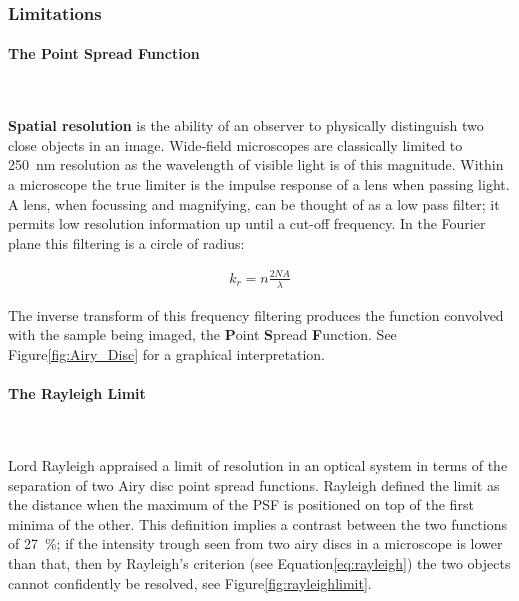 \subsubsection{Limitations}

\paragraph{The Point Spread Function}~

\textbf{Spatial resolution} is the ability of an observer to physically distinguish two close objects in an image\cite{Tsekenis2015}.
Wide-field microscopes are classically limited to \SI{250}{\nano\meter} resolution as the wavelength of visible light is of this magnitude\cite{Bradbury1998}.
Within a microscope the true limiter is the impulse response of a lens when passing light.
A lens, when focussing and magnifying, can be thought of as a low pass filter; it permits low resolution information up until a cut-off frequency.
In the Fourier plane this filtering is a circle of radius:

\begin{align}
k_r = n\frac{2 NA}{\lambda}
\end{align}

The inverse transform of this frequency filtering produces the function convolved with the sample being imaged, the \textbf{P}oint \textbf{S}pread \textbf{F}unction.
See Figure\ref{fig:Airy_Disc} for a graphical interpretation.

\paragraph{The Rayleigh Limit}~

Lord Rayleigh appraised a limit of resolution in an optical system in terms of the separation of two Airy disc point spread functions.
Rayleigh defined the limit as the distance when the maximum of the PSF is positioned on top of the first minima of the other.
This definition implies a contrast between the two functions of \SI{27}{\percent}; if the intensity trough seen from two airy discs in a microscope is lower than that, then by Rayleigh's criterion (see Equation\ref{eq:rayleigh}) the two objects cannot confidently be resolved, see Figure\ref{fig:rayleighlimit}.

